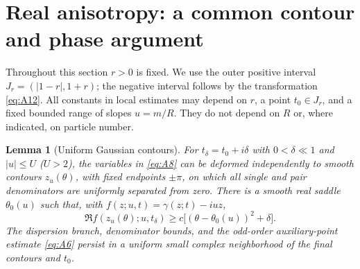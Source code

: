 \documentclass[11pt,a4paper]{article}
\numberwithin{equation}{section}
\theoremstyle{plain}
\newtheorem{lemma}[theorem]{Lemma}
\theoremstyle{definition}
\begin{document}
\section{Real anisotropy: a common contour and phase argument}\label{sec:realouter}

Throughout this section $r>0$ is fixed. We use the outer positive interval $J_r=(|1-r|,1+r)$; the negative interval follows by the transformation \eqref{eq:A12}. All constants in local estimates may depend on $r$, a point $t_0\in J_r$, and a fixed bounded range of slopes $u=m/R$. They do not depend on $R$ or, where indicated, on particle number.

\begin{lemma}[Uniform Gaussian contours]\label{lem:contour}
For $t_\delta=t_0+i\delta$ with $0<\delta\ll1$ and $|u|\le U$ ($U>2$), the variables in \eqref{eq:A8} can be deformed independently to smooth contours $z_u(\theta)$, with fixed endpoints $\pm\pi$, on which all single and pair denominators are uniformly separated from zero. There is a smooth real saddle $\theta_0(u)$ such that, with $f(z;u,t)=\gamma(z;t)-iuz$,
\begin{equation}
\Re f(z_u(\theta);u,t_\delta)\ge c\bigl[(\theta-\theta_0(u))^2+\delta\bigr].\label{eq:A14}
\end{equation}
The dispersion branch, denominator bounds, and the odd-order auxiliary-point estimate \eqref{eq:A6} persist in a uniform small complex neighborhood of the final contours and $t_0$.
\end{lemma}
\end{document}
